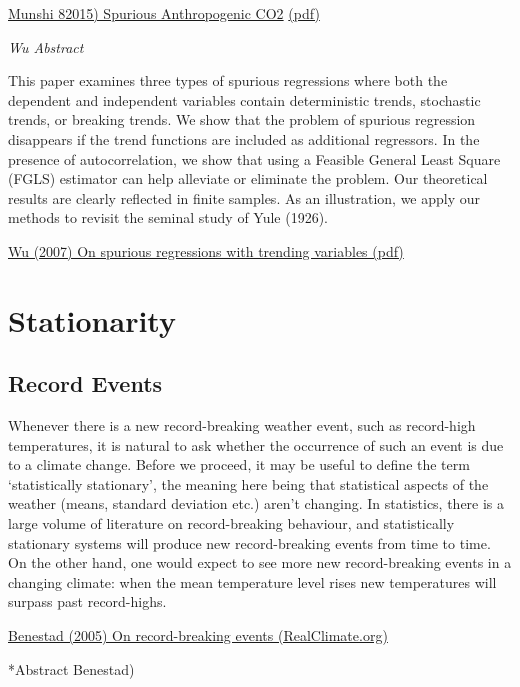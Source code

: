 \documentclass[
]{book}
\begin{document}
\href{https://papers.ssrn.com/sol3/papers.cfm?abstract_id=2642639}{Munshi 82015) Spurious Anthropogenic CO2}
\href{pdf/Munshi_2015_Spurious_Antropogenic_CO2.pdf}{(pdf)}

\emph{Wu Abstract}

This paper examines three types of spurious regressions where both the dependent and
independent variables contain deterministic trends, stochastic trends, or breaking trends. We
show that the problem of spurious regression disappears if the trend functions are included as
additional regressors. In the presence of autocorrelation, we show that using a Feasible General
Least Square (FGLS) estimator can help alleviate or eliminate the problem. Our theoretical
results are clearly reflected in finite samples. As an illustration, we apply our methods to revisit
the seminal study of Yule (1926).

\href{pdf/Wu_2007_Spurious_Trending.pdf}{Wu (2007) On spurious regressions with trending variables (pdf)}

\hypertarget{stationarity}{%
\chapter{Stationarity}\label{stationarity}}

\hypertarget{record-events}{%
\section{Record Events}\label{record-events}}

Whenever there is a new record-breaking weather event, such as record-high temperatures, it is natural to ask whether the occurrence of such an event is due to a climate change. Before we proceed, it may be useful to define the term `statistically stationary', the meaning here being that statistical aspects of the weather (means, standard deviation etc.) aren't changing. In statistics, there is a large volume of literature on record-breaking behaviour, and statistically stationary systems will produce new record-breaking events from time to time. On the other hand, one would expect to see more new record-breaking events in a changing climate: when the mean temperature level rises new temperatures will surpass past record-highs.

\href{https://www.realclimate.org/index.php/archives/2005/08/on-record-high-temperatures/}{Benestad (2005) On record-breaking events (RealClimate.org)}

*Abstract Benestad)
\end{document}
